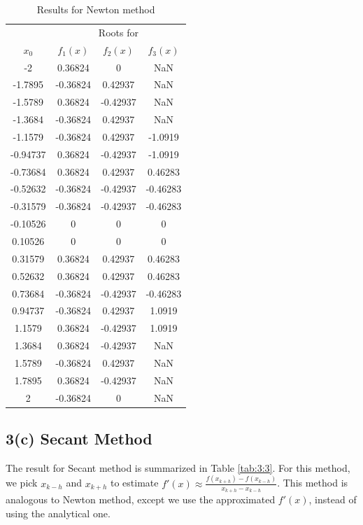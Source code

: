 \documentclass[11pt]{article}
\newcommand{\1}{\mathbbm{1}}
\begin{document}
	\begin{table}[H]
	\centering
	\begin{tabular}{c |c c c  }
		\hline
		\hline
			&\multicolumn{3}{c}{Roots for }\\
	     $x_{0}$   &   $f_{1}(x)$ &   $f_{2}(x)$ &   $f_{3}(x)$\\
	\hline
	-2  &   0.36824  &         0  &       NaN\\
	-1.7895  &  -0.36824  &   0.42937  &       NaN\\
	-1.5789  &   0.36824  &  -0.42937  &       NaN\\
	-1.3684  &  -0.36824  &   0.42937  &       NaN\\
	-1.1579  &  -0.36824  &   0.42937  &   -1.0919\\
	-0.94737  &   0.36824  &  -0.42937  &   -1.0919\\
	-0.73684  &   0.36824  &   0.42937  &   0.46283\\
	-0.52632  &  -0.36824  &  -0.42937  &  -0.46283\\
	-0.31579  &  -0.36824  &  -0.42937  &  -0.46283\\
	-0.10526  &         0  &         0  &         0\\
	0.10526  &         0  &         0  &         0\\
	0.31579  &   0.36824  &   0.42937  &   0.46283\\
	0.52632  &   0.36824  &   0.42937  &   0.46283\\
	0.73684  &  -0.36824  &  -0.42937  &  -0.46283\\
	0.94737  &  -0.36824  &   0.42937  &    1.0919\\
	1.1579  &   0.36824  &  -0.42937  &    1.0919\\
	1.3684  &   0.36824  &  -0.42937  &       NaN\\
	1.5789  &  -0.36824  &   0.42937  &       NaN\\
	1.7895  &   0.36824  &  -0.42937  &       NaN\\
	2  &  -0.36824  &         0  &       NaN\\
		\hline
		\hline
	\end{tabular} 
	\caption{Results for Newton method}
	\label{tab:3:2}
\end{table}

\subsection*{3(c) Secant Method}
The result for Secant method is summarized in Table \ref{tab:3:3}. For this method, we pick $x_{k-h}$ and $x_{k+h}$ to estimate $f'(x)\approx  \frac{f(x_{k+h})-f(x_{k-h})}{x_{k+h}-x_{k-h}}$. This method is analogous to Newton method, except we use the approximated $f'(x)$, instead of using the analytical one.
\end{document}
